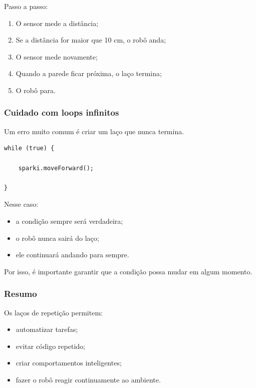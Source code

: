 \documentclass[conference]{IEEEtran}
\begin{document}
\vspace{0.2cm}

Passo a passo:
\begin{enumerate}
    \item O sensor mede a distância;
    \item Se a distância for maior que 10 cm, o robô anda;
    \item O sensor mede novamente;
    \item Quando a parede ficar próxima, o laço termina;
    \item O robô para.
\end{enumerate}

\vspace{0.3cm}

\subsubsection{Cuidado com loops infinitos}

Um erro muito comum é criar um laço que nunca termina.

\vspace{0.2cm}

\begin{lstlisting}[caption={Exemplo de loop infinito}]
while (true) {

    sparki.moveForward();

}
\end{lstlisting}

\vspace{0.2cm}

Nesse caso:
\begin{itemize}
    \item a condição sempre será verdadeira;
    \item o robô nunca sairá do laço;
    \item ele continuará andando para sempre.
\end{itemize}

\vspace{0.2cm}

Por isso, é importante garantir que a condição possa mudar em algum momento.

\vspace{0.3cm}

\subsubsection{Resumo}

Os laços de repetição permitem:
\begin{itemize}
    \item automatizar tarefas;
    \item evitar código repetido;
    \item criar comportamentos inteligentes;
    \item fazer o robô reagir continuamente ao ambiente.
\end{itemize}
\end{document}
